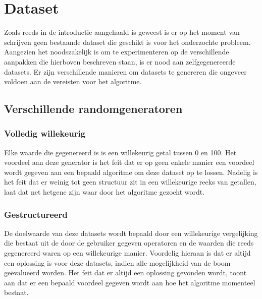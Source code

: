 \documentclass[Main.tex]{subfiles}
\begin{document}
\section{Dataset}

Zoals reeds in de introductie aangehaald is geweest is er op het moment van schrijven geen bestaande dataset die geschikt is voor het onderzochte probleem. Aangezien het noodszakelijk is om te experimenteren op de verschillende aanpakken die hierboven beschreven staan, is er nood aan zelfgegenereerde datasets. Er zijn verschillende manieren om datasets te genereren die ongeveer voldoen aan de vereisten voor het algoritme.
  
\subsection{Verschillende randomgeneratoren}
\subsubsection*{Volledig willekeurig}
Elke waarde die gegenereerd is is een willekeurig getal tussen 0 en 100. Het voordeel aan deze generator is het feit dat er op geen enkele manier een voordeel wordt gegeven aan een bepaald algoritme om deze dataset op te lossen. Nadelig is het feit dat er weinig tot geen structuur zit in een willekeurige reeks van getallen, laat dat net hetgene zijn waar door het algoritme gezocht wordt.

\subsubsection*{Gestructureerd}
De doelwaarde van deze datasets wordt bepaald door een willekeurige vergelijking die bestaat uit de door de gebruiker gegeven operatoren en de waarden die reeds gegenereerd waren op een willekeurige manier. Voordelig hieraan is dat er altijd een oplossing is voor deze datasets, indien alle mogelijkheid van de boom ge\"evalueerd worden. Het feit dat er altijd een oplossing gevonden wordt, toont aan dat er een bepaald voordeel gegeven wordt aan hoe het algoritme momenteel bestaat.
\end{document}
